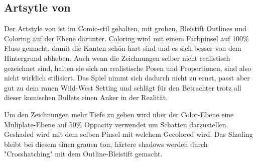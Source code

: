 \subsection{Artsytle von \FF}\label{subsec:artsytle}

Der Artstyle von \FF ist im Comic-stil gehalten, mit groben, Bleistift Outlines und Coloring auf der Ebene darunter.
Coloring wird mit einem Farbpinsel auf 100\% Fluss gemacht, damit die Kanten schön hart sind und es sich besser von dem Hintergrund abheben.
Auch wenn die Zeichnungen selber nicht realistisch gezeichnet sind, halten sie sich an realistische Posen und Propertionen, sind also nicht wirklich stilisiert.
Das Spiel nimmt sich dadurch nicht zu ernst, passt aber gut zu dem rauen Wild-West Setting und schlägt für den Betrachter trotz all dieser komischen Bullets
einen Anker in der Realität.

Um den Zeichnungen mehr Tiefe zu geben wird über der Color-Ebene eine Muliplate-Ebene auf 50\% Oppacity verwendet um Schatten
darzustellen. Geshaded wird mit dem selben Pinsel mit welchem Gecolored wird. Das Shading bleibt bei diesem einen grauen ton,
härtere shadows werden durch "Crosshatching" mit dem Outline-Bleistift gemacht.

%


%

\renewcommand{\kapitelautor}{}
